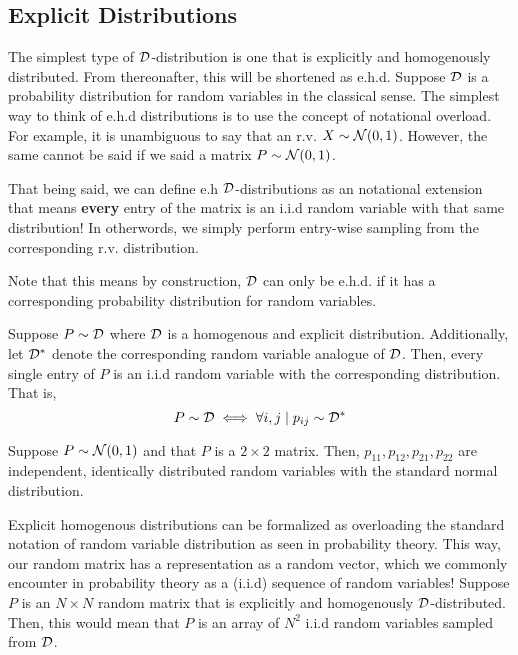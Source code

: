 
\subsection{Explicit Distributions}


The simplest type of $\mathcal{D}$-distribution is one that is explicitly and homogenously distributed. From thereonafter, this will be shortened as e.h.d.
Suppose $\mathcal{D}$ is a probability distribution for random variables in the classical sense. The simplest way to think of e.h.d distributions is to use the concept of notational overload.
For example, it is unambiguous to say that an r.v. $X \sim \mathcal{N}(0,1)$. However, the same cannot be said if we said a matrix $P \sim \mathcal{N}(0,1)$.

That being said, we can define e.h $\mathcal{D}$-distributions as an notational extension that means \textbf{every} entry of the matrix is an i.i.d random variable with that same distribution!
In otherwords, we simply perform entry-wise sampling from the corresponding r.v. distribution.

Note that this means by construction, $\mathcal{D}$ can only be e.h.d. if it has a corresponding probability distribution for random variables.

\begin{definition}
Suppose $P \sim \mathcal{D}$ where $\mathcal{D}$ is a homogenous and explicit distribution. Additionally, let $\mathcal{D}^*$ denote the corresponding random variable analogue of $\mathcal{D}$.
Then, every single entry of $P$ is an i.i.d random variable with the corresponding distribution. That is,
$$ P \sim \mathcal{D} \iff \forall i,j \mid p_{ij} \sim \mathcal{D}^* $$
\end{definition}

\begin{example}
Suppose $P \sim \mathcal{N}(0,1)$ and that $P$ is a $2 \times 2$ matrix.
Then, $p_{11}, p_{12}, p_{21}, p_{22}$ are independent, identically distributed random variables with the standard normal distribution.
\end{example}

\ALGexplicit

\begin{formalization}
Explicit homogenous distributions can be formalized as overloading the standard notation of random variable distribution as seen in probability theory.
This way, our random matrix has a representation as a random vector, which we commonly encounter in probability theory as a (i.i.d) sequence of random variables!
Suppose $P$ is an $N \times N$ random matrix that is explicitly and homogenously $\mathcal{D}$-distributed. Then, this would mean that $P$ is an array of $N^2$ i.i.d random variables sampled from $\mathcal{D}$.
\end{formalization}


